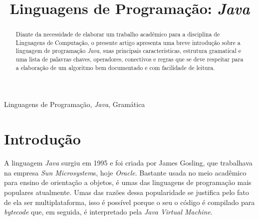 \documentclass[conference]{IEEEtran}
\begin{document}
\title{Linguagens de Programação: \textit{Java}\\
}

\author{
}

\maketitle

\begin{abstract}
Diante da necessidade de elaborar um trabalho acadêmico para a disciplina de Linguagens de Computação, o presente artigo apresenta uma breve introdução sobre a linguagem de programação \textit{Java}, suas principais características, estrutura gramatical e uma lista de palavras chaves, operadores, conectivos e regras que se deve respeitar para a elaboração de um algoritmo bem documentado e com facilidade de leitura.


\begin{comment}
Diante da necessidade de elaborar um trabalho acadêmico para a disciplina de Linguagens de Computação, o presente artigo apresenta uma breve introdução sobre a linguagem de programação Java, suas principais características, estrutura gramatical e uma lista de palavras chaves, operadores, conectivos e regras que se deve respeitar para a elaboração de um algoritmo bem documentado e com facilidade de leitura.
\end{comment}
\end{abstract}

\begin{IEEEkeywords}
Linguagens de Programação, \textit{Java}, Gramática
\end{IEEEkeywords}

\section{Introdução}
A linguagem \textit{Java} surgiu em 1995 e foi criada por James Gosling, que trabalhava na empresa \textit{Sun Microsystem}s, hoje \textit{Oracle}. Bastante usada no meio acadêmico para ensino de orientação a objetos, é umas das linguagens de programação mais populares atualmente. Umas das razões dessa popularidade se justifica pelo fato de ela ser multiplataforma, isso é possível porque o seu o código é compilado para \textit{bytecode} que, em seguida, é interpretado pela \textit{Java Virtual Machine}.
\end{document}
